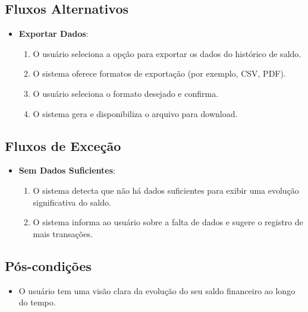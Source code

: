 \subsection*{Fluxos Alternativos}
\begin{addmargin}[1.5cm]{0cm}
    \begin{itemize}
        \item \textbf{Exportar Dados}:
        \begin{enumerate}
            \item O usuário seleciona a opção para exportar os dados do histórico de saldo.
            \item O sistema oferece formatos de exportação (por exemplo, CSV, PDF).
            \item O usuário seleciona o formato desejado e confirma.
            \item O sistema gera e disponibiliza o arquivo para download.
        \end{enumerate}
    \end{itemize}
\end{addmargin}

\subsection*{Fluxos de Exceção}
\begin{addmargin}[1.5cm]{0cm}
    \begin{itemize}
        \item \textbf{Sem Dados Suficientes}:
        \begin{enumerate}
            \item O sistema detecta que não há dados suficientes para exibir uma evolução significativa do saldo.
            \item O sistema informa ao usuário sobre a falta de dados e sugere o registro de mais transações.
        \end{enumerate}
    \end{itemize}
\end{addmargin}

\subsection*{Pós-condições}
\begin{addmargin}[1.5cm]{0cm}
    \begin{itemize}
        \item O usuário tem uma visão clara da evolução do seu saldo financeiro ao longo do tempo.
    \end{itemize}
\end{addmargin}

